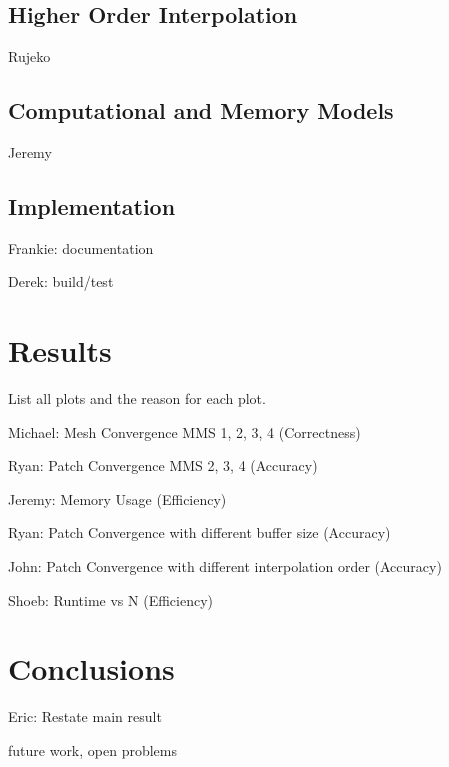 \subsection{Higher Order Interpolation}

Rujeko

\subsection{Computational and Memory Models}

Jeremy

\subsection{Implementation}

Frankie: documentation

Derek: build/test

\section{Results}\label{sec:results}

List all plots and the reason for each plot.

Michael: Mesh Convergence MMS 1, 2, 3, 4 (Correctness)

Ryan: Patch Convergence MMS 2, 3, 4 (Accuracy)

Jeremy: Memory Usage (Efficiency)

Ryan: Patch Convergence with different buffer size (Accuracy)

John: Patch Convergence with different interpolation order (Accuracy)

Shoeb: Runtime vs N (Efficiency)

\section{Conclusions}

Eric: Restate main result

future work, open problems
